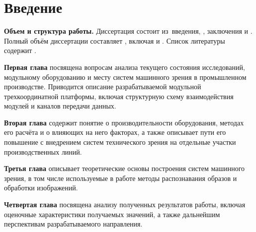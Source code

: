 \chapter*{Введение}                         %

\newcommand{\actuality}{}
\newcommand{\progress}{}
\newcommand{\aim}{{\textbf\aimTXT}}
\newcommand{\tasks}{\textbf{\tasksTXT}}
\newcommand{\novelty}{\textbf{\noveltyTXT}}
\newcommand{\influence}{\textbf{\influenceTXT}}
\newcommand{\methods}{\textbf{\methodsTXT}}
\newcommand{\defpositions}{\textbf{\defpositionsTXT}}
\newcommand{\reliability}{\textbf{\reliabilityTXT}}
\newcommand{\probation}{\textbf{\probationTXT}}
\newcommand{\contribution}{\textbf{\contributionTXT}}
\newcommand{\publications}{\textbf{\publicationsTXT}}


\textbf{Объем и структура работы.} Диссертация состоит из~введения,
,
заключения и
.
%
Полный объём диссертации составляет
, включая
 и
.
Список литературы содержит
.

\textbf{Первая глава} посвящена вопросам анализа текущего состояния исследований, модульному оборудованию и месту систем машинного зрения в промышленном производстве. Приводится описание разрабатываемой модульной трехкоординатной платформы, включая структурную схему взаимодействия модулей и каналов передачи данных.

\textbf{Вторая глава} содержит понятие о производительности оборудования, методах его расчёта и о влияющих на него факторах, а также описывает пути его повышение с внедрением систем технического зрения на отдельные участки производственных линий.

\textbf{Третья глава} описывает теоретические основы построения систем машинного зрения, в том числе используемые в работе методы распознавания образов и обработки изображений.

\textbf{Четвертая глава} посвящена анализу полученных результатов работы, включая оценочные характеристики получаемых значений, а также дальнейшим перспективам разрабатываемого направления.
